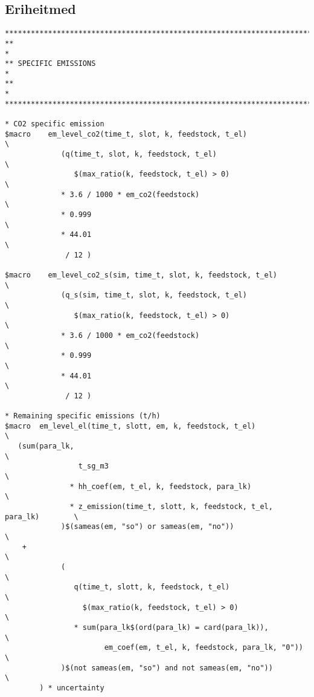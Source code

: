 \subsection{Eriheitmed}
\begin{verbatim}
********************************************************************************
**                                                                             *
** SPECIFIC EMISSIONS                                                          *
**                                                                             *
********************************************************************************

* CO2 specific emission
$macro    em_level_co2(time_t, slot, k, feedstock, t_el)                       \
             (q(time_t, slot, k, feedstock, t_el)                              \
                $(max_ratio(k, feedstock, t_el) > 0)                           \
             * 3.6 / 1000 * em_co2(feedstock)                                  \
             * 0.999                                                           \
             * 44.01                                                           \
              / 12 )

$macro    em_level_co2_s(sim, time_t, slot, k, feedstock, t_el)                \
             (q_s(sim, time_t, slot, k, feedstock, t_el)                       \
                $(max_ratio(k, feedstock, t_el) > 0)                           \
             * 3.6 / 1000 * em_co2(feedstock)                                  \
             * 0.999                                                           \
             * 44.01                                                           \
              / 12 )

* Remaining specific emissions (t/h)
$macro  em_level_el(time_t, slott, em, k, feedstock, t_el)                     \
   (sum(para_lk,                                                               \
                 t_sg_m3                                                       \
               * hh_coef(em, t_el, k, feedstock, para_lk)                      \
               * z_emission(time_t, slott, k, feedstock, t_el, para_lk)        \
             )$(sameas(em, "so") or sameas(em, "no"))                          \
    +                                                                          \
             (                                                                 \
                q(time_t, slott, k, feedstock, t_el)                           \
                  $(max_ratio(k, feedstock, t_el) > 0)                         \
                * sum(para_lk$(ord(para_lk) = card(para_lk)),                  \
                       em_coef(em, t_el, k, feedstock, para_lk, "0"))          \
             )$(not sameas(em, "so") and not sameas(em, "no"))                 \
        ) * uncertainty


\end{verbatim}
